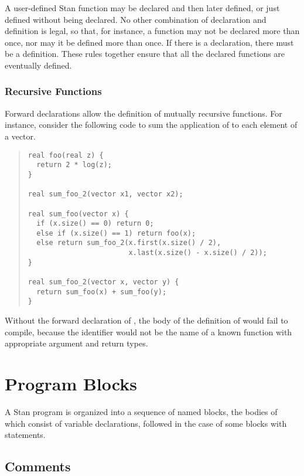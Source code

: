A user-defined Stan function may be declared and then later defined,
or just defined without being declared.  No other combination of
declaration and definition is legal, so that, for instance, a function
may not be declared more than once, nor may it be defined more than
once.  If there is a declaration, there must be a definition.  These
rules together ensure that all the declared functions are eventually
defined.

\subsection{Recursive Functions}

Forward declarations allow the definition of mutually recursive
functions.  For instance, consider the following code to sum the
application of  to each element of a vector.
%
\begin{quote}
\begin{Verbatim}
real foo(real z) {
  return 2 * log(z);
}

real sum_foo_2(vector x1, vector x2);

real sum_foo(vector x) {
  if (x.size() == 0) return 0;
  else if (x.size() == 1) return foo(x);
  else return sum_foo_2(x.first(x.size() / 2), 
                        x.last(x.size() - x.size() / 2));
}

real sum_foo_2(vector x, vector y) {
  return sum_foo(x) + sum_foo(y);
}
\end{Verbatim}
\end{quote}
%
Without the forward declaration of , the body of the
definition of  would fail to compile, because the
identifier  would not be the name of a known
function with appropriate argument and return types.





\chapter{Program Blocks}\label{blocks.chapter}

\noindent
A Stan program is organized into a sequence of named blocks, the
bodies of which consist of variable declarations, followed in the case
of some blocks with statements.  

\section{Comments}\label{comments.section}


